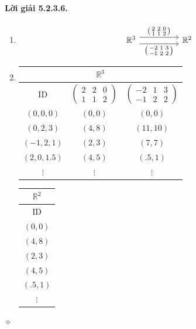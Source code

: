 \paragraph{Lời giải 5.2.3.6.}
\begin{enumerate}[label=\alph*.]
\item
\[\begin{tikzcd}[ampersand replacement=\&,column sep=huge,row sep=large]
\mathbb R^3\arrow[r,shift left=4pt,"{\left(\begin{smallmatrix}2&2&0\\1&1&2\end{smallmatrix}\right)}"]\arrow[r,shift right=4pt,"{\left(\begin{smallmatrix}-2&1&3\\-1&2&2\end{smallmatrix}\right)}"']\&\mathbb R^2
\end{tikzcd}\]
\item
\begin{center}\small
\begin{tabular}{|c|c|c|}\hline\multicolumn{3}{|c|}{$\mathbb R^3$}\\\hline ID&$\left(\begin{smallmatrix}2&2&0\\1&1&2\end{smallmatrix}\right)$&$\left(\begin{smallmatrix}-2&1&3\\-1&2&2\end{smallmatrix}\right)$\\\hline
$(0,0,0)$&$(0,0)$&$(0,0)$\\$(0,2,3)$&$(4,8)$&$(11,10)$\\$(-1,2,1)$&$(2,3)$&$(7,7)$\\$(2,0,1.5)$&$(4,5)$&$(.5,1)$\\$\vdots$&$\vdots$&$\vdots$\\\hline\end{tabular}\qquad
\begin{tabular}{|c|}\hline$\mathbb R^2$\\\hline ID\\\hline$(0,0)$\\$(4,8)$\\$(2,3)$\\$(4,5)$\\$(.5,1)$\\$\vdots$\\\hline\end{tabular}
\end{center}
\end{enumerate}\hfill$\diamond$
